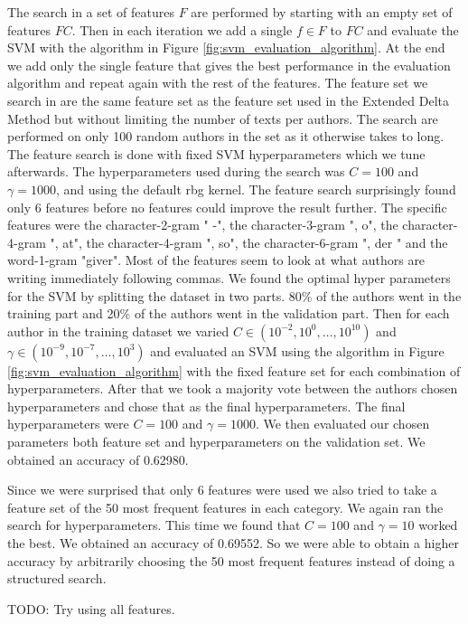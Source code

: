 The search in a set of features $F$ are performed by starting with an
empty set of features $FC$. Then in each iteration we add a single
$f \in F$ to $FC$ and evaluate the SVM with the algorithm in Figure
\ref{fig:svm_evaluation_algorithm}. At the end we add only the single feature
that gives the best performance in the evaluation algorithm and repeat again
with the rest of the features. The feature set we search in are the same feature
set as the feature set used in the Extended Delta Method but without limiting
the number of texts per authors. The search are performed on only 100 random
authors in the set as it otherwise takes to long. The feature search is done
with fixed SVM hyperparameters which we tune afterwards. The hyperparameters
used during the search was $C = 100$ and $\gamma = 1000$, and using the default
rbg kernel. The feature search surprisingly found only 6 features before no
features could improve the result further. The specific features were the
character-2-gram " -", the character-3-gram ", o", the character-4-gram ", at",
the character-4-gram ", so", the character-6-gram ", der " and the word-1-gram
"giver". Most of the features seem to look at what authors are writing
immediately following commas. We found the optimal hyper parameters for the SVM
by splitting the dataset in two parts. 80\% of the authors went in the training
part and 20\% of the authors went in the validation part. Then for each author
in the training dataset we varied $C \in (10^{-2}, 10^0, \dots, 10^{10})$ and
$\gamma \in (10^{-9}, 10^{-7}, \dots, 10^3)$ and evaluated an SVM using the
algorithm in Figure \ref{fig:svm_evaluation_algorithm} with the fixed feature
set for each combination of hyperparameters. After that we took a majority
vote between the authors chosen hyperparameters and chose that as the final
hyperparameters. The final hyperparameters were $C = 100$ and $\gamma = 1000$.
We then evaluated our chosen parameters both feature set and hyperparameters on
the validation set. We obtained an accuracy of 0.62980.

Since we were surprised that only 6 features were used we also tried to take a
feature set of the 50 most frequent features in each category. We again ran the
search for hyperparameters. This time we found that $C = 100$ and $\gamma = 10$
worked the best. We obtained an accuracy of 0.69552. So we were able to obtain a
higher accuracy by arbitrarily choosing the 50 most frequent features instead of
doing a structured search.

TODO: Try using all features.



